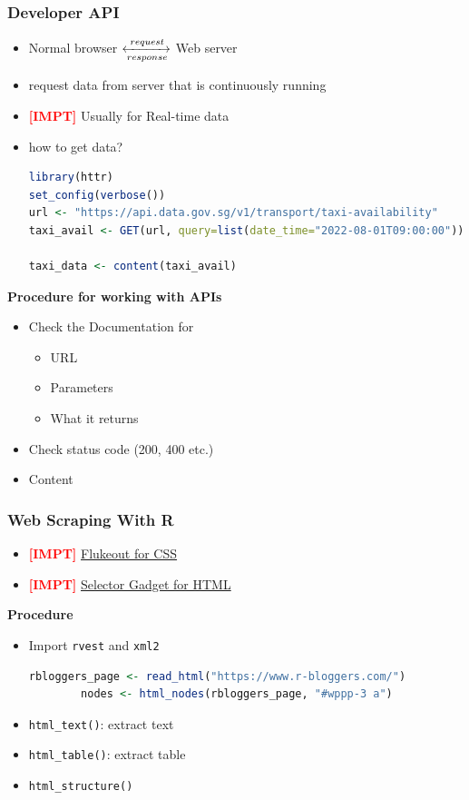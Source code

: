 \documentclass{article}
\newcommand{\impt}[0]{\textcolor{red}{\textbf{[IMPT] }}}
\begin{document}
\begin{multicols}{2}
\subsubsection{Developer API}
\begin{itemize}
	\item Normal browser $\xleftrightarrow[response]{request}$ Web server
	\item request data from server that is continuously running
	\item \impt Usually for Real-time data
	\item how to get data?
	\begin{lstlisting}[language=R]
library(httr)
set_config(verbose())
url <- "https://api.data.gov.sg/v1/transport/taxi-availability"
taxi_avail <- GET(url, query=list(date_time="2022-08-01T09:00:00"))

taxi_data <- content(taxi_avail)
	\end{lstlisting}
\end{itemize}

\textbf{Procedure for working with APIs}
\begin{itemize}
	\item Check the Documentation for
	\begin{itemize}
		\item URL
		\item Parameters
		\item What it returns
	\end{itemize}
    \item Check status code (200, 400 etc.)
    \item Content
\end{itemize}
\subsubsection{Web Scraping With R}
\begin{itemize}
	\item \impt \href{flukeout.github.io}{Flukeout for CSS}
	\item \impt \href{selectorgadget.com}{Selector Gadget for HTML}
\end{itemize}
\textbf{Procedure}
\begin{itemize}
	\item Import \texttt{rvest} and \texttt{xml2}
	\begin{lstlisting}[language=R]
		rbloggers_page <- read_html("https://www.r-bloggers.com/")
		nodes <- html_nodes(rbloggers_page, "#wppp-3 a")\end{lstlisting}
	\item \texttt{html\_text()}: extract text
	\item \texttt{html\_table()}: extract table
	\item \texttt{html\_structure()}
\end{itemize}

\end{multicols}
\end{document}
